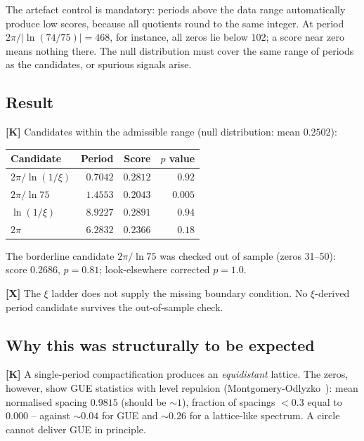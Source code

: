 The artefact control is mandatory: periods above the data range
automatically produce low scores, because all quotients round to the
same integer. At period $2\pi/|\ln(74/75)| = 468$, for instance, all
zeros lie below $102$; a score near zero means nothing there. The null
distribution must cover the same range of periods as the candidates,
or spurious signals arise.

\subsection{Result}

\textbf{[K]} Candidates within the admissible range (null distribution:
mean $0.2502$):

\begin{center}
\begin{tabular}{lrrr}
\toprule
Candidate & Period & Score & $p$ value \\
\midrule
$2\pi/\ln(1/\xi)$ & $0.7042$ & $0.2812$ & $0.92$ \\
$2\pi/\ln 75$ & $1.4553$ & $0.2043$ & $\mathbf{0.005}$ \\
$\ln(1/\xi)$ & $8.9227$ & $0.2891$ & $0.94$ \\
$2\pi$ & $6.2832$ & $0.2366$ & $0.18$ \\
\bottomrule
\end{tabular}
\end{center}

The borderline candidate $2\pi/\ln 75$ was checked out of sample (zeros
31--50): score $0.2686$, $p = 0.81$; look-elsewhere corrected
$p = 1.0$.

\begin{keyresult}
\textbf{[X]} The $\xi$ ladder does not supply the missing boundary
condition. No $\xi$-derived period candidate survives the out-of-sample
check.
\end{keyresult}

\subsection{Why this was structurally to be expected}

\textbf{[K]} A single-period compactification produces an
\emph{equidistant} lattice. The zeros, however, show GUE statistics with
level repulsion (Montgomery-Odlyzko~\cite{montgomery1973,odlyzko1987}): mean normalised spacing $0.9815$
(should be ${\sim}1$), fraction of spacings $< 0.3$ equal to
\textbf{$0.000$} -- against ${\sim}0.04$ for GUE and ${\sim}0.26$ for a
lattice-like spectrum. A circle cannot deliver GUE in principle.

